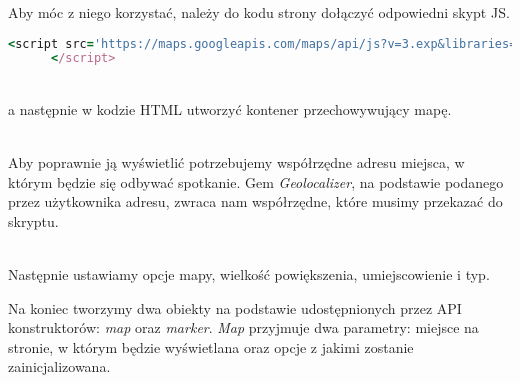 Aby móc z niego korzystać, należy do kodu strony dołączyć odpowiedni skypt JS.
\begin{code}
  \begin{lstlisting}[language=Ruby, basicstyle=\ttfamily\scriptsize, showstringspaces=false]
      <script src='https://maps.googleapis.com/maps/api/js?v=3.exp&libraries=places'>
      </script>
  \end{lstlisting}
\end{code}\\

a następnie w kodzie HTML utworzyć kontener przechowywujący mapę.
\begin{code}
  
\end{code}\\

Aby poprawnie ją wyświetlić potrzebujemy współrzędne adresu miejsca, w którym będzie się odbywać spotkanie. Gem \emph{Geolocalizer}, na podstawie podanego przez użytkownika adresu, zwraca nam współrzędne, które musimy przekazać do skryptu.

\begin{code}
  
\end{code}\\

Następnie ustawiamy opcje mapy, wielkość powiększenia, umiejscowienie i typ.

Na koniec tworzymy dwa obiekty na podstawie udostępnionych przez API konstruktorów: \emph{map} oraz \emph{marker}. \emph{Map} przyjmuje dwa parametry: miejsce na stronie, w którym będzie wyświetlana oraz opcje z jakimi zostanie zainicjalizowana.
